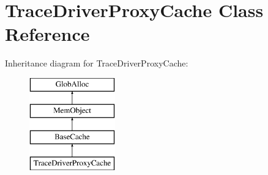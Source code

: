 \hypertarget{classTraceDriverProxyCache}{\section{Trace\-Driver\-Proxy\-Cache Class Reference}
\label{classTraceDriverProxyCache}
}
Inheritance diagram for Trace\-Driver\-Proxy\-Cache\-:\begin{figure}[H]
\begin{center}
\leavevmode
\includegraphics[height=4.000000cm]{classTraceDriverProxyCache}
\end{center}
\end{figure}
